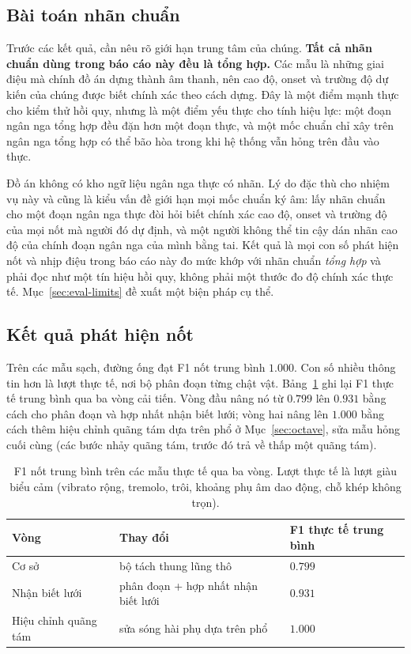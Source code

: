 \documentclass[12pt,a4paper]{article}
\begin{document}
\subsection{Bài toán nhãn chuẩn}
\label{sec:groundtruth}

Trước các kết quả, cần nêu rõ giới hạn trung tâm của chúng. \textbf{Tất cả nhãn
chuẩn dùng trong báo cáo này đều là tổng hợp.} Các mẫu là những giai điệu mà chính
đồ án dựng thành âm thanh, nên cao độ, onset và trường độ dự kiến của chúng được biết
chính xác theo cách dựng. Đây là một điểm mạnh thực cho kiểm thử hồi quy, nhưng là
một điểm yếu thực cho tính hiệu lực: một đoạn ngân nga tổng hợp đều đặn hơn một đoạn
thực, và một mốc chuẩn chỉ xây trên ngân nga tổng hợp có thể bão hòa trong khi hệ
thống vẫn hỏng trên đầu vào thực.

Đồ án không có kho ngữ liệu ngân nga thực có nhãn. Lý do đặc thù cho nhiệm vụ này và
cũng là kiểu vấn đề giới hạn mọi mốc chuẩn ký âm: lấy nhãn chuẩn cho một đoạn ngân
nga thực đòi hỏi biết chính xác cao độ, onset và trường độ của mọi nốt mà người đó
dự định, và một người không thể tin cậy dán nhãn cao độ của chính đoạn ngân nga của
mình bằng tai. Kết quả là mọi con số phát hiện nốt và nhịp điệu trong báo cáo này đo
mức khớp với nhãn chuẩn \emph{tổng hợp} và phải đọc như một tín hiệu hồi quy, không
phải một thước đo độ chính xác thực tế. Mục~\ref{sec:eval-limits} đề xuất một biện
pháp cụ thể.

\subsection{Kết quả phát hiện nốt}
\label{sec:results-note}

Trên các mẫu sạch, đường ống đạt F1 nốt trung bình $1.000$. Con số nhiều thông tin
hơn là lượt thực tế, nơi bộ phân đoạn từng chật vật.
Bảng~\ref{tab:note-progression} ghi lại F1 thực tế trung bình qua ba vòng cải tiến.
Vòng đầu nâng nó từ $0.799$ lên $0.931$ bằng cách cho phân đoạn và hợp nhất nhận
biết lưới; vòng hai nâng lên $1.000$ bằng cách thêm hiệu chỉnh quãng tám dựa trên
phổ ở Mục~\ref{sec:octave}, sửa mẫu hỏng cuối cùng (các bước nhảy quãng tám, trước
đó trả về thấp một quãng tám).

\begin{table}[H]
\centering
\caption{F1 nốt trung bình trên các mẫu thực tế qua ba vòng. Lượt thực tế là lượt
giàu biểu cảm (vibrato rộng, tremolo, trôi, khoảng phụ âm dao động, chỗ khép không
trọn).}
\label{tab:note-progression}
\begin{tabular}{l l l}
\toprule
\textbf{Vòng} & \textbf{Thay đổi} & \textbf{F1 thực tế trung bình} \\
\midrule
Cơ sở                 & bộ tách thung lũng thô                 & $0.799$ \\
Nhận biết lưới        & phân đoạn + hợp nhất nhận biết lưới     & $0.931$ \\
Hiệu chỉnh quãng tám  & sửa sóng hài phụ dựa trên phổ           & $1.000$ \\
\bottomrule
\end{tabular}
\end{table}
\end{document}

